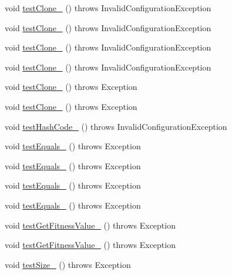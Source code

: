 \begin{DoxyCompactItemize}
void \hyperlink{classorg_1_1jgap_1_1_chromosome_test_aa4a82aaa3663f9f872b9dee934d48837}{test\-Clone\-\_} ()  throws Invalid\-Configuration\-Exception 
\item 
void \hyperlink{classorg_1_1jgap_1_1_chromosome_test_abab66cfa25fa59aae7ea0f3d99c33225}{test\-Clone\-\_} ()  throws Invalid\-Configuration\-Exception 
\item 
void \hyperlink{classorg_1_1jgap_1_1_chromosome_test_a03673190df90af1afba271b3455c1618}{test\-Clone\-\_} ()  throws Invalid\-Configuration\-Exception 
\item 
void \hyperlink{classorg_1_1jgap_1_1_chromosome_test_a58e371a9c93a7023b32851fe820ffe09}{test\-Clone\-\_} ()  throws Invalid\-Configuration\-Exception 
\item 
void \hyperlink{classorg_1_1jgap_1_1_chromosome_test_abf4b8088ca47aeeba7d0f43b3faecbbb}{test\-Clone\-\_} ()  throws Exception 
\item 
void \hyperlink{classorg_1_1jgap_1_1_chromosome_test_abcd1bd4ea6d5a117e35668752f1255df}{test\-Clone\-\_} ()  throws Exception 
\item 
void \hyperlink{classorg_1_1jgap_1_1_chromosome_test_a489cfcc18676536402e52ee6d390fb51}{test\-Hash\-Code\-\_} ()  throws Invalid\-Configuration\-Exception 
\item 
void \hyperlink{classorg_1_1jgap_1_1_chromosome_test_ad5bdf2fdda9844d57ccf06fb47c1fb8f}{test\-Equals\-\_} ()  throws Exception 
\item 
void \hyperlink{classorg_1_1jgap_1_1_chromosome_test_adfdf4c81333c8b63c82fa5167b8c5ab6}{test\-Equals\-\_} ()  throws Exception 
\item 
void \hyperlink{classorg_1_1jgap_1_1_chromosome_test_a4751a3bdfcbbd6971ce08de638d728ad}{test\-Equals\-\_} ()  throws Exception 
\item 
void \hyperlink{classorg_1_1jgap_1_1_chromosome_test_af8b451a1da200ab905e01a15e9153d57}{test\-Equals\-\_} ()  throws Exception 
\item 
void \hyperlink{classorg_1_1jgap_1_1_chromosome_test_aacbbd4432e0d5601758d71c19dc8bf0d}{test\-Get\-Fitness\-Value\-\_} ()  throws Exception 
\item 
void \hyperlink{classorg_1_1jgap_1_1_chromosome_test_a57e50b09589cc7aac38ba9ee8cd36783}{test\-Get\-Fitness\-Value\-\_} ()  throws Exception 
\item 
void \hyperlink{classorg_1_1jgap_1_1_chromosome_test_a2b2a793cbb620eeb969fb17edbdb1747}{test\-Size\-\_} ()  throws Exception 
\item 

\end{DoxyCompactItemize}
